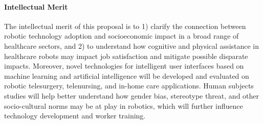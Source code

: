 
\vspace{0.5 em}

\paragraph*{\Large Intellectual Merit}
The intellectual merit of this proposal is to 1) clarify the connection between robotic technology adoption and socioeconomic impact in a broad range of healthcare sectors, and 2) to understand how cognitive and physical assistance in healthcare robots may impact job satisfaction and mitigate possible disparate impacts.  Moreover, novel technologies for intelligent user interfaces based on machine learning and artificial intelligence will be developed and evaluated on robotic telesurgery, telenursing, and in-home care applications.  Human subjects studies will help better understand how gender bias, stereotype threat, and other socio-cultural norms may be at play in robotics, which will further influence technology development and worker training. 

